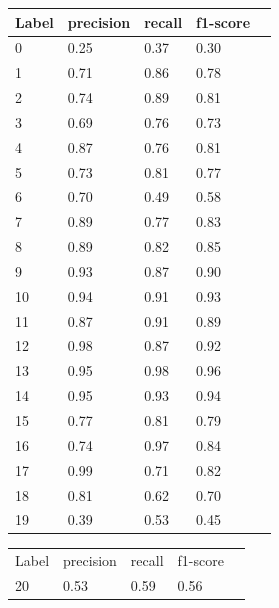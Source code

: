 \begin{table}[h!]
\begin{minipage}{.5\linewidth}
  \centering
  \begin{tabular}{| l | l | l | l | l |}
  \hline
  \rowcolor{lightgray} Label & precision & recall & f1-score  \\ [0.5ex]
   \hline
   0   &    0.25   &   0.37  &    0.30 \\
   \hline
   1   &    0.71   &   0.86  &    0.78 \\
   \hline
   2   &    0.74   &   0.89  &    0.81 \\
   \hline
   3   &    0.69   &   0.76  &    0.73 \\
   \hline
   4   &    0.87   &   0.76  &    0.81 \\
   \hline
   5   &    0.73   &   0.81  &    0.77 \\
   \hline
   6   &    0.70   &   0.49  &    0.58 \\
   \hline
   7   &    0.89   &   0.77  &    0.83 \\
   \hline
   8   &    0.89   &   0.82  &    0.85 \\
   \hline
   9   &    0.93   &   0.87  &    0.90 \\
   \hline
  10   &    0.94   &   0.91  &    0.93 \\
  \hline
  11   &    0.87   &   0.91  &    0.89 \\
  \hline
  12   &    0.98   &   0.87  &    0.92 \\
  \hline
  13   &    0.95   &   0.98  &    0.96 \\
  \hline
  14   &    0.95   &   0.93  &    0.94 \\
  \hline
  15   &    0.77   &   0.81  &    0.79 \\
  \hline
  16   &    0.74   &   0.97  &    0.84 \\
  \hline
  17   &    0.99   &   0.71  &    0.82 \\
  \hline
  18   &    0.81   &   0.62  &    0.70 \\
  \hline
  19   &    0.39   &   0.53  &    0.45 \\
  \hline
 \end{tabular}
 \end{minipage}%
\begin{minipage}{.5\linewidth}
\centering
  \begin{tabular}{| l | l | l | l | l |}
   \hline
   \rowcolor{lightgray} Label & precision & recall & f1-score \\ [0.5ex]
   20   &    0.53   &   0.59  &    0.56 \\

\end{tabular}
\end{minipage}
\end{table}
